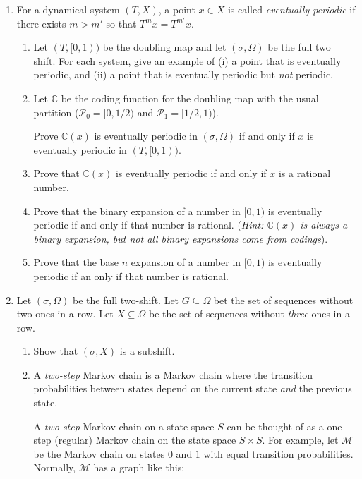 \documentclass[letter]{article}
\newcommand{\setheader}[6]{
	\lhead{{\sc #1}\\{\sc #2} ({\small \it \today})}
	\rhead{
		{\bf #3} 
		\ifthenelse{\equal{#4}{}}{}{(#4)}\\
		{\bf #5} 
		\ifthenelse{\equal{#6}{}}{}{(#6)}%
	}
}
\newcommand{\C}{\mathbb{C}}
\begin{document}
	\setheader{MAT335}{Homework 4}{Due: 11:59pm April 6}{}{}{}

	\begin{enumerate}
		\item For a dynamical system $(T,X)$, a point $x\in X$ is called \emph{eventually periodic} if there 
			exists $m>m'$ so that $T^mx=T^{m'}x$.
		\begin{enumerate}
			\item Let $(T,[0,1))$ be the doubling map and let $(\sigma,\Omega)$ be the full two shift.
				For each system, give an example of (i) a point that is eventually periodic, and (ii)
				a point that is eventually periodic but \emph{not} periodic.
			\item Let $\C$ be the coding function for the doubling map with the usual partition ($\mathcal P_0=[0,1/2)$
				and $\mathcal P_1=[1/2,1)$).

				Prove $\C(x)$ is eventually periodic in $(\sigma, \Omega)$ if and only if $x$ is eventually
				periodic in $(T,[0,1))$.
			\item Prove that $\C(x)$ is eventually periodic if and only if $x$ is a rational number.
			\item Prove that the binary expansion of a number in $[0,1)$ is eventually periodic if and only
				if that number is rational. (\emph{Hint: $\C(x)$ is always a binary expansion, but not all
				binary expansions come from codings}).
			\item Prove that the base $n$ expansion of a number in $[0,1)$ is eventually periodic if an only if that
				number is rational.
		\end{enumerate}

		\item Let $(\sigma, \Omega)$ be the full two-shift. Let $G\subseteq\Omega$ 
			bet the set of sequences without two ones in a row.
			Let $X\subseteq \Omega$ be the set of sequences without \emph{three} ones in a row.
			\begin{enumerate}
				\item Show that $(\sigma, X)$ is a subshift.
				\item A \emph{two-step} Markov chain is a Markov chain where the transition probabilities
					between states depend on the current state \emph{and} the previous state. 
					
					A \emph{two-step} Markov chain on a state space $S$ can be thought of as a 
					one-step (regular) Markov chain on the state space $S\times S$. For example, let
					$\mathcal M$ be the Markov
					chain on states $0$ and $1$ with equal transition probabilities.
					Normally, $\mathcal M$ has a graph like this:


\end{enumerate}
\end{enumerate}
\end{document}
